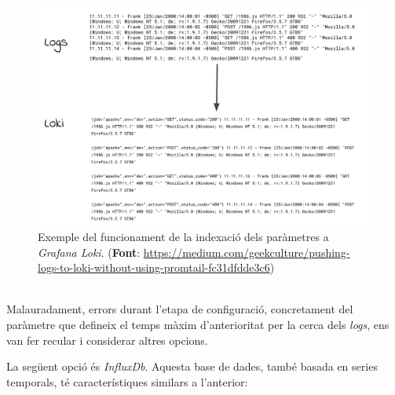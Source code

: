 \clearpage

\begin{figure}[htbp]
    \centerline{\includegraphics[width=1\textwidth]{figures/loki-indexing}}
    \captionsetup{justification=centering}
    \caption[Exemple del funcionament de la indexació dels paràmetres a \textit{Grafana Loki}.]{Exemple del funcionament de la indexació dels paràmetres a \textit{Grafana Loki}. (\textbf{Font}: \url{https://medium.com/geekculture/pushing-logs-to-loki-without-using-promtail-fc31dfdde3c6})}\label{fig:loki-indexing}
\end{figure}

\noindent \\
Malauradament, errors durant l’etapa de configuració, concretament del paràmetre que defineix el temps màxim d'anterioritat per la cerca dels \textit{\gls{log}s}, ens van fer recular i considerar altres opcions.

\clearpage

\noindent
La següent opció és \textit{InfluxDb}.
Aquesta base de dades, també basada en series temporals, té característiques similars a l’anterior:

